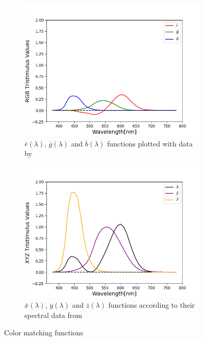 \begin{figure}[t]
	\centering
	\begin{subfigure}{0.46\textwidth}
		\includegraphics[width=\linewidth]{img/matching_functions_rgb.png}
		\caption{ $\overline{r}(\lambda)$, $\overline{g}(\lambda)$ and $\overline{b}(\lambda)$ functions plotted with data by~\citet{colorMatchingRGBData}}
		\label{fig:colorMatchingRGB}
	\end{subfigure}
	\quad
	\begin{subfigure}{0.46\textwidth}
		\includegraphics[width=\linewidth]{img/matching_functions_xyz.png}
		\caption{$\overline{x}(\lambda)$, $\overline{y}(\lambda)$ and $\overline{z}(\lambda)$ functions according to their spectral data from~\citet{colorMatchingXYZData}}
		\label{fig:colorMatchingXYZ}
	\end{subfigure}
	\caption{Color matching functions}
	\label{fig:colorMatchingFunctions}
\end{figure}

